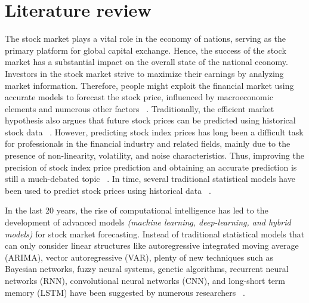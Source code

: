 \section{Literature review}
\label{sec:litreview}
The stock market plays a vital role in the economy of nations, serving as the primary platform for global capital exchange. Hence, the success of the stock market has a substantial impact on the overall state of the national economy. Investors in the stock market strive to maximize their earnings by analyzing market information.  Therefore, people might exploit the financial market using accurate models to forecast the stock price, influenced by macroeconomic elements and numerous other factors ~\citep{gao2020application}. 
Traditionally, the efficient market hypothesis also argues that future stock prices can be predicted using historical stock data ~\citep{fama1970efficient, shahi2020stock}. However, predicting stock index prices has long been a difficult task for professionals in the financial industry and related fields, mainly due to the presence of non-linearity, volatility, and noise characteristics. Thus, improving the precision of stock index price prediction and obtaining an accurate prediction is still a much-debated topic ~\citep{binkowski2018autoregressive}. In time, several traditional statistical models have been used to predict stock prices using historical data ~\citep{jarrett2011arima, tsai2012relationship, mensi2014global, sahoo2015stock, cakra2015stock, suharsono2017comparison, ma2018investor, izzeldin2019forecasting, tulcanaza2019determinants, ning2019stock}. 

In the last 20 years, the rise of computational intelligence has led to the development of advanced models \textit{(machine learning, deep-learning, and hybrid models)} for stock market forecasting. Instead of traditional statistical models that can only consider linear structures like autoregressive integrated moving average (ARIMA), vector autoregressive (VAR), plenty of new techniques such as Bayesian networks, fuzzy neural systems, genetic algorithms, recurrent neural networks (RNN), convolutional neural networks (CNN), and long-short term memory (LSTM) have been suggested by numerous researchers ~\citep{cheng2010hybrid, karazmodeh2013stock, chen2015hybrid, chong2017deep, hiransha2018nse, cao2020multiobjective, nikou2019stock, hargreaves2020stock, shahi2020stock, setiani2021prediction, pahlawan2021stock, alkhatib2022new, nasiri2023multi}. 

